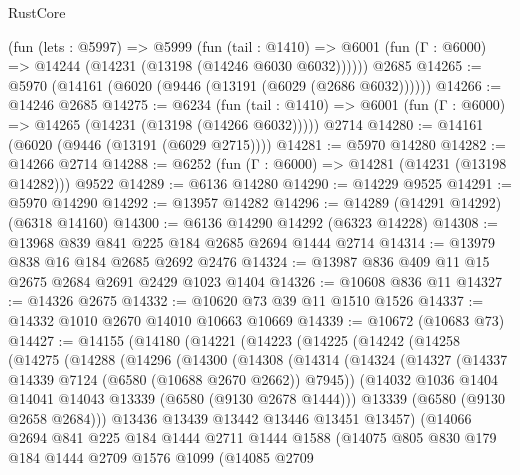 \begin{lexlean}{RustCore}
\begin{coremodule}
    (fun (lets : @5997) =>
    @5999
      (fun (tail : @1410) =>
      @6001 (fun (Γ : @6000) => @14244 (@14231 (@13198 (@14246 @6030 @6032))))))
    @2685
@14265 := @5970 (@14161 (@6020 (@9446 (@13191 (@6029 (@2686 @6032))))))
@14266 := @14246 @2685
@14275 := @6234
    (fun (tail : @1410) => @6001 (fun (Γ : @6000) => @14265 (@14231 (@13198 (@14266 @6032)))))
    @2714
@14280 := @14161 (@6020 (@9446 (@13191 (@6029 @2715))))
@14281 := @5970 @14280
@14282 := @14266 @2714
@14288 := @6252 (fun (Γ : @6000) => @14281 (@14231 (@13198 @14282))) @9522
@14289 := @6136 @14280
@14290 := @14229 @9525
@14291 := @5970 @14290
@14292 := @13957 @14282
@14296 := @14289 (@14291 @14292) (@6318 @14160)
@14300 := @6136 @14290 @14292 (@6323 @14228)
@14308 := @13968 @839 @841 @225 @184 @2685 @2694 @1444 @2714
@14314 := @13979 @838 @16 @184 @2685 @2692 @2476
@14324 := @13987 @836 @409 @11 @15 @2675 @2684 @2691 @2429 @1023 @1404
@14326 := @10608 @836 @11
@14327 := @14326 @2675
@14332 := @10620 @73 @39 @11 @1510 @1526
@14337 := @14332 @1010 @2670 @14010 @10663 @10669
@14339 := @10672 (@10683 @73)
@14427 := @14155
    (@14180
      (@14221
        (@14223
          (@14225
            (@14242
              (@14258
                (@14275
                  (@14288
                    (@14296
                      (@14300
                        (@14308
                          (@14314
                            (@14324
                              (@14327 (@14337 @14339 @7124 (@6580 (@10688 @2670 @2662)) @7945))
                              (@14032 @1036 @1404 @14041 @14043 @13339 (@6580 (@9130 @2678 @1444)))
                              @13339
                              (@6580 (@9130 @2658 @2684)))
                            @13436
                            @13439
                            @13442
                            @13446
                            @13451
                            @13457)
                          (@14066
                            @2694
                            @841
                            @225
                            @184
                            @1444
                            @2711
                            @1444
                            @1588
                            (@14075
                              @805
                              @830
                              @179
                              @184
                              @1444
                              @2709
                              @1576
                              @1099
                              (@14085
                                @2709

\end{coremodule}
\end{lexlean}
